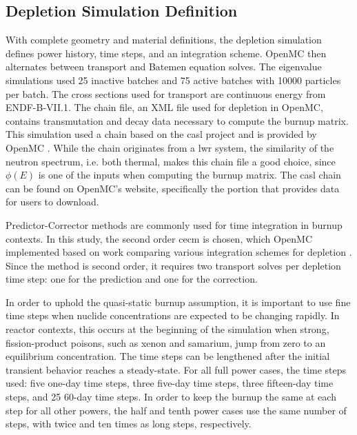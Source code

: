 \documentclass[letterpaper]{physor2024}
\begin{document}
\subsection{Depletion Simulation Definition}\label{sec:depl_sim}
With complete geometry and material definitions, the depletion simulation defines power history, time steps, and an integration scheme. OpenMC then alternates between transport and Batemen equation solves. The eigenvalue simulations used 25 inactive batches and 75 active batches with 10000 particles per batch. The cross sections used for transport are continuous energy from ENDF-B-VII.1. The chain file, an XML file used for depletion in OpenMC, contains transmutation and decay data necessary to compute the burnup matrix. This simulation used a chain based on the \gls{casl} project \cite{CASL-report} and is provided by OpenMC \cite{openmc-chains}. While the chain originates from a \gls{lwr} system, the similarity of the neutron spectrum, i.e. both thermal, makes this chain file a good choice, since $\phi(E)$ is one of the inputs when computing the burnup matrix. The \gls{casl} chain can be found on OpenMC's website, specifically the portion that provides data for users to download.

Predictor-Corrector methods are commonly used for time integration in burnup contexts. In this study, the second order \gls{cecm} is chosen, which OpenMC implemented based on work comparing various integration schemes for depletion \cite{isotalo_comparison_2015}. Since the method is second order, it requires two transport solves per depletion time step: one for the prediction and one for the correction.

In order to uphold the quasi-static burnup assumption, it is important to use fine time steps when nuclide concentrations are expected to be changing rapidly. In reactor contexts, this occurs at the beginning of the simulation when strong, fission-product poisons, such as xenon and samarium, jump from zero to an equilibrium concentration. The time steps can be lengthened after the initial transient behavior reaches a steady-state. For all full power cases, the time steps used: five one-day time steps, three five-day time steps, three fifteen-day time steps, and 25 60-day time steps. In order to keep the burnup the same at each step for all other powers, the half and tenth power cases use the same number of steps, with twice and ten times as long steps, respectively.
\end{document}
